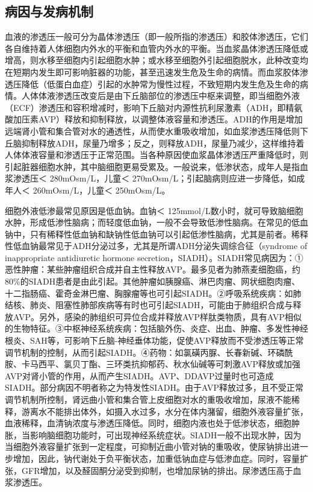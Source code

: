 \subsection{病因与发病机制}

血液的渗透压一般可分为晶体渗透压（即一般所指的渗透压）和胶体渗透压，它们各自维持着人体细胞内外水的平衡和血管内外水的平衡。当血浆晶体渗透压降低或增高，则水移至细胞内引起细胞水肿；或水移至细胞外引起细胞脱水，此种改变均在短期内发生即可影响脏器的功能，甚至迅速发生危及生命的病情。而血浆胶体渗透压降低（低蛋白血症）引起的水肿常为慢性过程，不致短期内发生危及生命的病情。人体体液渗透压改变后是由下丘脑部位的渗透压中枢来调整，即当细胞外液（ECF）渗透压和容积增减时，影响下丘脑对内源性抗利尿激素（ADH，即精氨酸加压素AVP）释放和抑制释放，以调整体液容量和渗透压。ADH的作用是增加远端肾小管和集合管对水的通透性，从而使水重吸收增加，如血浆渗透压降低则下丘脑抑制释放ADH，尿量乃增多；反之，则释放ADH，尿量乃减少，这样维持着人体体液容量和渗透压于正常范围。当各种原因使血浆晶体渗透压严重降低时，则引起脏器细胞水肿，其中脑细胞更易受累及。一般说来，低渗状态，成年人是指血浆渗透压＜
280mOsm/L，儿童＜ 270mOsm/L；引起脑病则应进一步降低，如成年人＜
260mOsm/L，儿童＜ 250mOsm/L。

细胞外液低渗最常见原因是低血钠。血钠＜
125mmol/L数小时，就可导致脑细胞水肿，形成低渗性脑病；而轻度低血钠，一般不会导致低渗性脑病。在常见的低血钠中，只有稀释性低血钠和缺钠性低血钠可以引起低渗性脑病，尤其是前者。稀释性低血钠最常见于ADH分泌过多，尤其是所谓ADH分泌失调综合征（syndrome
of inappropriate antidiuretic hormone
secretion，SIADH）。SIADH常见病因为：①恶性肿瘤：某些肿瘤组织合成并自主性释放AVP。最多见者为肺燕麦细胞癌，约80\%的SIADH患者是由此引起。其他肿瘤如胰腺癌、淋巴肉瘤、网状细胞肉瘤、十二指肠癌、霍奇金淋巴瘤、胸腺瘤等也可引起SIADH。②呼吸系统疾病：如肺结核、肺炎、阻塞性肺部疾病等有时也可引起SIADH，可能由于肺组织合成与释放AVP。另外，感染的肺组织可异位合成并释放AVP样肽类物质，具有AVP相似的生物特征。③中枢神经系统疾病：包括脑外伤、炎症、出血、肿瘤、多发性神经根炎、SAH等，可影响下丘脑-神经垂体功能，促使AVP释放而不受渗透压等正常调节机制的控制，从而引起SIADH。④药物：如氯磺丙脲、长春新碱、环磷酰胺、卡马西平、氯贝丁酯、三环类抗抑郁药、秋水仙碱等可刺激AVP释放或加强AVP对肾小管的作用，从而产生SIADH。AVP、DDAVP过量时也可造成SIADH。部分病因不明者称之为特发性SIADH。由于AVP释放过多，且不受正常调节机制所控制，肾远曲小管和集合管上皮细胞对水的重吸收增加，尿液不能稀释，游离水不能排出体外，如摄入水过多，水分在体内潴留，细胞外液容量扩张，血液稀释，血清钠浓度与渗透压降低。同时，细胞内液也处于低渗状态，细胞肿胀，当影响脑细胞功能时，可出现神经系统症状。SIADH一般不出现水肿，因为当细胞外液容量扩张到一定程度，可抑制近曲小管对钠的重吸收，使尿钠排出进一步增加，因此，钠代谢处于负平衡状态，加重低钠血症与低渗血症。同时，容量扩张，GFR增加，以及醛固酮分泌受到抑制，也增加尿钠的排出。尿渗透压高于血浆渗透压。

